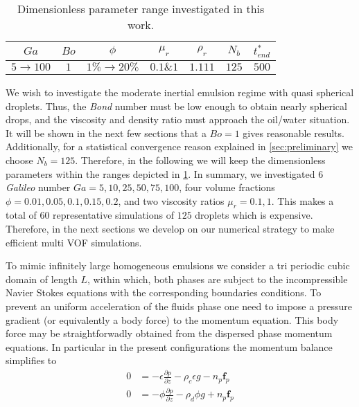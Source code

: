 \begin{table}[h!]
    \centering
    \caption{Dimensionless parameter range investigated in this work.}
    \begin{tabular}{ccccccc}\hline
        $Ga$&$Bo$&$\phi$&$\mu_r$&$\rho_r$&$N_b$&$t^*_{end}$\\ \hline\hline
        $5\rightarrow 100$&$1$&$1\% \rightarrow 20\%$&$0.1 \& 1$&$1.111$&$125$&$500$\\ \hline
    \end{tabular}
    \label{tab:parameters}
\end{table}

We wish to investigate the moderate inertial emulsion regime with quasi spherical droplets. 
Thus, the \textit{Bond} number must be low enough to obtain nearly spherical drops, and the viscosity and density ratio must approach the oil/water situation. 
It will be shown in the next few sections that a $Bo =1$ gives reasonable results. 
Additionally, for a statistical convergence reason explained in \ref{sec:preliminary} we choose $N_b = 125$. 
Therefore, in the following we will keep the dimensionless parameters within the ranges depicted in \ref{tab:parameters}.
In summary, we investigated $6$ \textit{Galileo} number $Ga = 5,10,25,50,75,100$, four volume fractions $\phi = 0.01,0.05,0.1,0.15,0.2$, and two viscosity ratios $\mu_r =0.1,1$. 
This makes a total of $60$ representative simulations of $125$ droplets which is expensive. 
Therefore, in the next sections we develop on our numerical strategy to make efficient multi VOF simulations. 


To mimic infinitely large homogeneous emulsions we consider a tri periodic cubic domain of length $L$, within which, both phases are subject to the incompressible Navier Stokes equations with the corresponding boundaries conditions. To prevent an uniform acceleration of the fluids phase one need to impose a pressure gradient (or equivalently a body force) to the momentum equation. This body force may be straightforwadly obtained from the dispersed phase momentum equations. In particular in the present configurations the momentum balance simplifies to
\begin{align}
0 &= -\epsilon\frac{\partial p}{\partial z} - \rho_c \epsilon g - n_p \textbf{f}_p \label{eq:uf_triperio}
    \\
0 &= -\phi\frac{\partial p}{\partial z}     - \rho_d \phi g + n_p \textbf{f}_p \label{eq:up_triperio}
\end{align}


